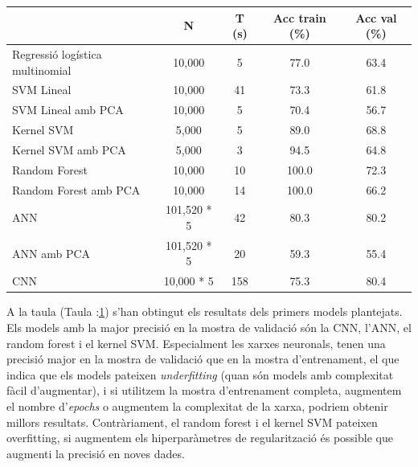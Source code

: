 \documentclass[12pt, spanish]{article}
\begin{document}
\begin{table}[hbt!]
\centering
\begin{tabular}{lcccc}  
\toprule
                                              & N         & T (s)  & Acc train (\%) & Acc val (\%) \\  
\midrule
Regressió logística multinomial  & 10,000 & 5   & 77.0        & 63.4 \\
SVM Lineal                              & 10,000 & 41  & 73.3       & 61.8  \\
SVM Lineal amb PCA                & 10,000 & 5    & 70.4       & 56.7  \\
Kernel SVM                             & 5,000   & 5    & 89.0       & 68.8  \\
Kernel SVM amb PCA               & 5,000   & 3    & 94.5       & 64.8  \\
Random Forest                        & 10,000 & 10  & 100.0     & 72.3 \\
Random Forest amb PCA          & 10,000 & 14  & 100.0     & 66.2  \\
ANN 				      & 101,520 * 5 & 42 & 80.3 & 80.2  \\
ANN amb PCA                         & 101,520 * 5 & 20 & 59.3 & 55.4 \\
CNN					     & 10,000 * 5   & 158 & 75.3 & 80.4 \\
\bottomrule
\end{tabular}
\label{tab:taula2}
\end{table}

A la taula (Taula :\ref{tab:taula2}) s'han obtingut els resultats dels primers models plantejats. Els models amb la major precisió en la mostra de validació són la CNN, l'ANN, el random forest i el kernel SVM. Especialment les xarxes neuronals, tenen una precisió major en la mostra de validació que en la mostra d'entrenament, el que indica que els models pateixen \textit{underfitting} (quan són models amb complexitat fàcil d'augmentar), i si utilitzem la mostra d'entrenament completa, augmentem el nombre d'\textit{epochs} o augmentem la complexitat de la xarxa, podriem obtenir millors resultats. Contràriament, el random forest i el kernel SVM pateixen overfitting, si augmentem els hiperparàmetres de regularització és possible que augmenti la precisió en noves dades. 
\end{document}
